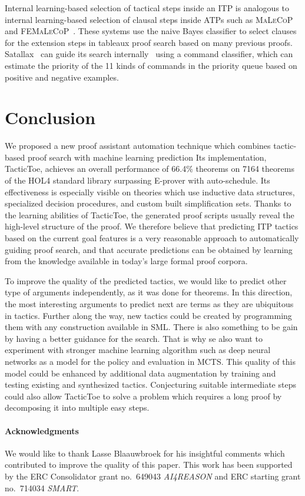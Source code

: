 \documentclass[runningheads,a4paper,draft]{svjour3}
\def\holfour{\textsf{HOL4}\xspace}
\def\eprover{\textsf{E-prover}\xspace}
\def\sml{\textsf{SML}\xspace}
\def\tactictoe{\textsf{TacticToe}\xspace}
\begin{document}
Internal learning-based selection of tactical steps inside an ITP is analogous
to internal learning-based selection of clausal steps inside ATPs such as
\textsc{MaLeCoP}~\cite{malecop} and \textsc{FEMaLeCoP}~\cite{femalecop}. These
systems
use the naive Bayes classifier to  select clauses for the extension steps in
tableaux proof search based on many previous proofs. Satallax~\cite{Brown2012a}
can guide its
search internally~\cite{mllax} using a command classifier, which can estimate
the priority of the 11 kinds of
commands in the priority queue based on positive and negative examples.


\section{Conclusion}\label{sec:concl}

We proposed a new proof assistant automation technique which combines
tactic-based proof search with machine learning prediction
Its implementation, \tactictoe, achieves an overall performance of 66.4\%
theorems on 7164 theorems of the \holfour standard library surpassing \eprover
with auto-schedule. Its
effectiveness is especially visible on
theories which use inductive data structures, specialized decision procedures,
and custom built simplification sets.
Thanks to the learning abilities of \tactictoe, the generated proof scripts
usually reveal the high-level structure of the proof. %
We therefore believe that predicting ITP tactics based on the current goal
features is a very reasonable approach to automatically guiding proof search,
and that accurate predictions can be obtained by learning from the knowledge
available in today's large formal proof corpora.

To improve the quality of the predicted tactics,
we would like to predict other type of arguments independently, as it was done
for theorems. In this direction, the most interesting arguments to
predict next are terms as they are ubiquitous in tactics. Further along the way,
new tactics could be created by programming them with any construction
available in \sml. There is also something to be gain by
having a better guidance for the search.
That is why se also want to experiment with stronger machine learning algorithm
such as deep neural networks as a model for the policy and evaluation in MCTS.
This quality of this model could be enhanced by additional data augmentation by
training and testing existing and synthesized tactics.
Conjecturing suitable intermediate steps could also allow \tactictoe to solve
a problem which requires a long proof by decomposing it into multiple easy
steps.

\paragraph{Acknowledgments}\label{sect:acks}
We would like to thank Lasse Blaauwbroek for his insightful comments which
contributed to improve the quality of this paper. This work has been supported
by the ERC Consolidator grant no.\ 649043 \textit{AI4REASON} and ERC starting
grant no.\ 714034 \textit{SMART}.



\end{document}
